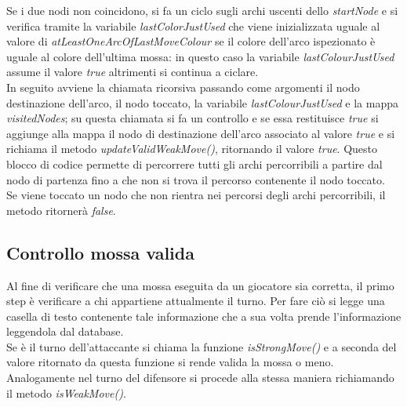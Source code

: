 \documentclass[a4paper,11pt,twoside,openright]{report}
\begin{document}
Se i due nodi non coincidono, si fa un ciclo sugli archi uscenti dello \textit{startNode} e si verifica tramite la variabile \textit{lastColorJustUsed} che viene inizializzata uguale al valore di \textit{atLeastOneArcOfLastMoveColour} se il colore dell'arco ispezionato è uguale al colore dell'ultima mossa: in questo caso la variabile \textit{lastColourJustUsed} assume il valore \textit{true} altrimenti si continua a ciclare.\\
In seguito avviene la chiamata ricorsiva passando come argomenti il nodo destinazione dell'arco, il nodo toccato, la variabile \textit{lastColourJustUsed} e la mappa \textit{visitedNodes}; su questa chiamata si fa un controllo e se essa restituisce \textit{true} si aggiunge alla mappa il nodo di destinazione dell'arco associato al valore \textit{true} e si richiama il metodo \textit{updateValidWeakMove()}, ritornando il valore \textit{true}. Questo blocco di codice permette di percorrere tutti gli archi percorribili a partire dal nodo di partenza fino a che non si trova il percorso contenente il nodo toccato.\\
Se viene toccato un nodo che non rientra nei percorsi degli archi percorribili, il metodo ritornerà \textit{false}.

\subsection{Controllo mossa valida}
Al fine di verificare che una mossa eseguita da un giocatore sia corretta, il primo step è verificare a chi appartiene attualmente il turno. Per fare ciò si legge una casella di testo contenente tale informazione che a sua volta prende l'informazione leggendola dal database.\\
Se è il turno dell'attaccante si chiama la funzione \textit{isStrongMove()} e a seconda del valore ritornato da questa funzione si rende valida la mossa o meno.\\
Analogamente nel turno del difensore si procede alla stessa maniera richiamando il metodo \textit{isWeakMove()}.
\end{document}
